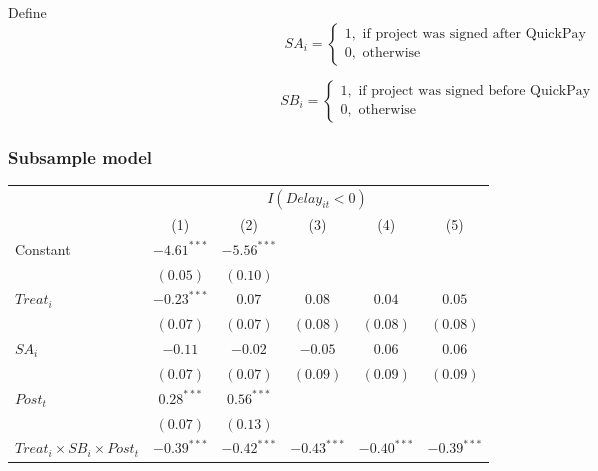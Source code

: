\documentclass[
]{article}
\begin{document}
Define
\[ SA_i = \begin{cases} 1, \text{ if project was signed after QuickPay}\\
0, \text{ otherwise} \end{cases}\]

\[ SB_i = \begin{cases} 1, \text{ if project was signed before QuickPay}\\
0, \text{ otherwise} \end{cases}\]

\hypertarget{subsample-model}{%
\subsubsection{Subsample model}\label{subsample-model}}

\begin{table}
\begin{center}
\begin{tabular}{l c c c c c}
\hline
 & \multicolumn{5}{c}{$I(Delay_{it}<0)$} \\
\cline{2-6}
 & (1) & (2) & (3) & (4) & (5) \\
\hline
Constant                                   & $-4.61^{***}$ & $-5.56^{***}$ &               &               &               \\
                                           & $(0.05)$      & $(0.10)$      &               &               &               \\
$Treat_i$                                  & $-0.23^{***}$ & $0.07$        & $0.08$        & $0.04$        & $0.05$        \\
                                           & $(0.07)$      & $(0.07)$      & $(0.08)$      & $(0.08)$      & $(0.08)$      \\
$SA_i$                                     & $-0.11$       & $-0.02$       & $-0.05$       & $0.06$        & $0.06$        \\
                                           & $(0.07)$      & $(0.07)$      & $(0.09)$      & $(0.09)$      & $(0.09)$      \\
$Post_t$                                   & $0.28^{***}$  & $0.56^{***}$  &               &               &               \\
                                           & $(0.07)$      & $(0.13)$      &               &               &               \\
$Treat_i \times SB_i \times Post_t$        & $-0.39^{***}$ & $-0.42^{***}$ & $-0.43^{***}$ & $-0.40^{***}$ & $-0.39^{***}$ \\

\end{tabular}
\end{center}
\end{table}
\end{document}
